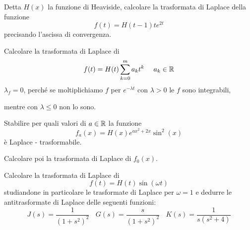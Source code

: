 Detta $\displaystyle H(x)$ la funzione di Heaviside, calcolare la trasformata di Laplace della funzione
\begin{equation*}
f(t) = H(t - 1) te^{2t}
\end{equation*}
precisando l'ascissa di convergenza.
\Esercizio{}

Calcolare la trasformata di Laplace di
\begin{equation*}
f(t) = H(t)\sum^{m}_{k = 0} a_{k} t^{k} \ \ \ \ a_{k} \in \RR
\end{equation*}
$\displaystyle \lambda_{f} = 0$, perché se moltiplichiamo $\displaystyle f$ per $\displaystyle e^{- \lambda t}$ con $\displaystyle \lambda > 0$ le $\displaystyle f$ sono integrabili,

mentre con $\displaystyle \lambda \leq 0$ non lo sono.
\Esercizio{}

Stabilire per quali valori di $\displaystyle a\in \mathbb{R} $ la funzione
\begin{equation*}
f_{a}(x) = H(x) e^{ax^{2} + 2x}\sin^{2}(x)
\end{equation*}
è Laplace - trasformabile.

Calcolare poi la trasformata di Laplace di $\displaystyle f_{0}(x)$.
\Esercizio{}

Calcolare la trasformata di Laplace di
\begin{equation*}
f(t) = H(t)\sin(\omega t)
\end{equation*}
studiandone in particolare le trasformate di Laplace per $\displaystyle \omega = 1$ e dedurre le antitrasformate di Laplace delle seguenti funzioni:
\begin{equation*}
J(s) = \frac{1}{\left(1 + s^{2}\right)^{2}} \ \ \ \ G(s) = \frac{s}{\left(1 + s^{2}\right)^{2}} \ \ \ \ K(s) = \frac{1}{s\left(s^{2} + 4\right)}
\end{equation*}
\ParteSoluzioni
\Soluzione

